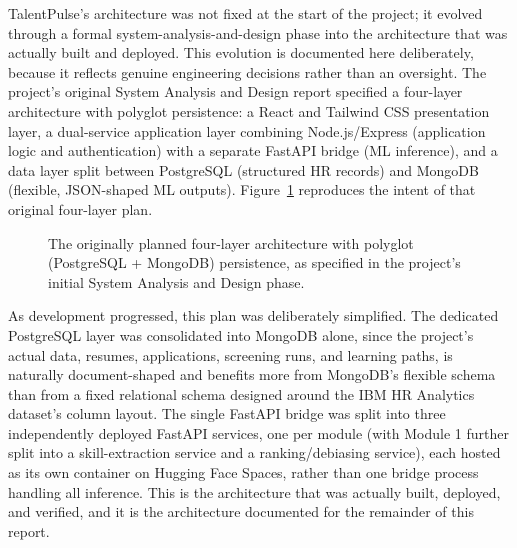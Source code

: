 \documentclass[11pt,a4paper]{article}
\begin{document}
TalentPulse's architecture was not fixed at the start of the project; it evolved through a formal system-analysis-and-design phase into the architecture that was actually built and deployed. This evolution is documented here deliberately, because it reflects genuine engineering decisions rather than an oversight. The project's original System Analysis and Design report specified a four-layer architecture with polyglot persistence: a React and Tailwind CSS presentation layer, a dual-service application layer combining Node.js/Express (application logic and authentication) with a separate FastAPI bridge (ML inference), and a data layer split between PostgreSQL (structured HR records) and MongoDB (flexible, JSON-shaped ML outputs). Figure~\ref{fig:arch-original} reproduces the intent of that original four-layer plan.

\begin{figure}[H]
\centering
{}
\caption{The originally planned four-layer architecture with polyglot (PostgreSQL + MongoDB) persistence, as specified in the project's initial System Analysis and Design phase.}
\label{fig:arch-original}
\end{figure}

As development progressed, this plan was deliberately simplified. The dedicated PostgreSQL layer was consolidated into MongoDB alone, since the project's actual data, resumes, applications, screening runs, and learning paths, is naturally document-shaped and benefits more from MongoDB's flexible schema than from a fixed relational schema designed around the IBM HR Analytics dataset's column layout. The single FastAPI bridge was split into three independently deployed FastAPI services, one per module (with Module 1 further split into a skill-extraction service and a ranking/debiasing service), each hosted as its own container on Hugging Face Spaces, rather than one bridge process handling all inference. This is the architecture that was actually built, deployed, and verified, and it is the architecture documented for the remainder of this report.
\end{document}

